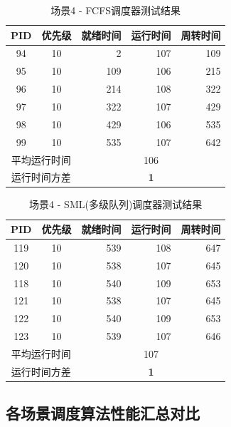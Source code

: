 \documentclass[a4paper, 12pt]{article}
\begin{document}
\begin{table}[H]
	\centering
	\caption{场景4 - FCFS调度器测试结果}
	\begin{tabular}{ccrrr}
		\toprule
		\textbf{PID} & \textbf{优先级} & \textbf{就绪时间} & \textbf{运行时间} & \textbf{周转时间} \\
		\midrule
		94 & 10 & 2 & 107 & 109 \\
		95 & 10 & 109 & 106 & 215 \\
		96 & 10 & 214 & 108 & 322 \\
		97 & 10 & 322 & 107 & 429 \\
		98 & 10 & 429 & 106 & 535 \\
		99 & 10 & 535 & 107 & 642 \\
		\midrule
		\multicolumn{2}{c}{平均运行时间} & \multicolumn{3}{c}{106} \\
		\multicolumn{2}{c}{运行时间方差} & \multicolumn{3}{c}{\textbf{1}} \\
		\bottomrule
	\end{tabular}
\end{table}

\begin{table}[H]
	\centering
	\caption{场景4 - SML(多级队列)调度器测试结果}
	\begin{tabular}{ccrrr}
		\toprule
		\textbf{PID} & \textbf{优先级} & \textbf{就绪时间} & \textbf{运行时间} & \textbf{周转时间} \\
		\midrule
		119 & 10 & 539 & 108 & 647 \\
		120 & 10 & 538 & 107 & 645 \\
		118 & 10 & 540 & 109 & 653 \\
		121 & 10 & 538 & 107 & 645 \\
		122 & 10 & 540 & 109 & 653 \\
		123 & 10 & 539 & 107 & 646 \\
		\midrule
		\multicolumn{2}{c}{平均运行时间} & \multicolumn{3}{c}{107} \\
		\multicolumn{2}{c}{运行时间方差} & \multicolumn{3}{c}{\textbf{1}} \\
		\bottomrule
	\end{tabular}
\end{table}

\subsection{各场景调度算法性能汇总对比}
\end{document}
